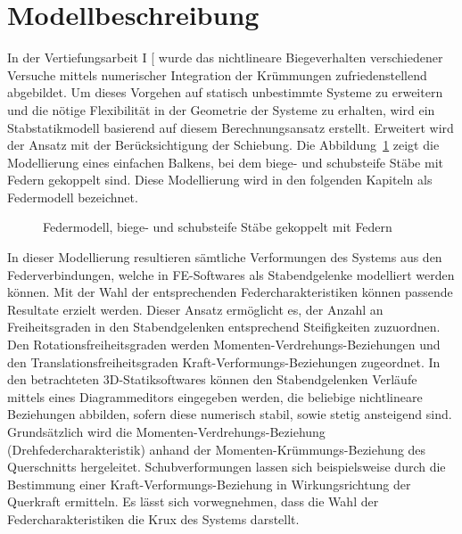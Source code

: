 \documentclass[
  11pt,
  letterpaper,
]{scrreprt}
\begin{document}
\section{Modellbeschreibung}\label{sec-modellvorstellung}

In der Vertiefungsarbeit I {[}\citeproc{ref-gitz_ansatze_2024}{1}{]}
wurde das nichtlineare Biegeverhalten verschiedener Versuche mittels
numerischer Integration der Krümmungen zufriedenstellend abgebildet. Um
dieses Vorgehen auf statisch unbestimmte Systeme zu erweitern und die
nötige Flexibilität in der Geometrie der Systeme zu erhalten, wird ein
Stabstatikmodell basierend auf diesem Berechnungsansatz erstellt.
Erweitert wird der Ansatz mit der Berücksichtigung der Schiebung. Die
Abbildung~\ref{fig-modell_drehfeder} zeigt die Modellierung eines
einfachen Balkens, bei dem biege- und schubsteife Stäbe mit Federn
gekoppelt sind. Diese Modellierung wird in den folgenden Kapiteln als
Federmodell bezeichnet.

\begin{figure}[H]


\caption{\label{fig-modell_drehfeder}Federmodell, biege- und schubsteife
Stäbe gekoppelt mit Federn}

\end{figure}%

In dieser Modellierung resultieren sämtliche Verformungen des Systems
aus den Federverbindungen, welche in FE-Softwares als Stabendgelenke
modelliert werden können. Mit der Wahl der entsprechenden
Federcharakteristiken können passende Resultate erzielt werden. Dieser
Ansatz ermöglicht es, der Anzahl an Freiheitsgraden in den
Stabendgelenken entsprechend Steifigkeiten zuzuordnen. Den
Rotationsfreiheitsgraden werden Momenten-Verdrehungs-Beziehungen und den
Translationsfreiheitsgraden Kraft-Verformungs-Beziehungen zugeordnet. In
den betrachteten 3D-Statiksoftwares können den Stabendgelenken Verläufe
mittels eines Diagrammeditors eingegeben werden, die beliebige
nichtlineare Beziehungen abbilden, sofern diese numerisch stabil, sowie
stetig ansteigend sind. Grundsätzlich wird die
Momenten-Verdrehungs-Beziehung (Drehfedercharakteristik) anhand der
Momenten-Krümmungs-Beziehung des Querschnitts hergeleitet.
Schubverformungen lassen sich beispielsweise durch die Bestimmung einer
Kraft-Verformungs-Beziehung in Wirkungsrichtung der Querkraft ermitteln.
Es lässt sich vorwegnehmen, dass die Wahl der Federcharakteristiken die
Krux des Systems darstellt.
\end{document}
